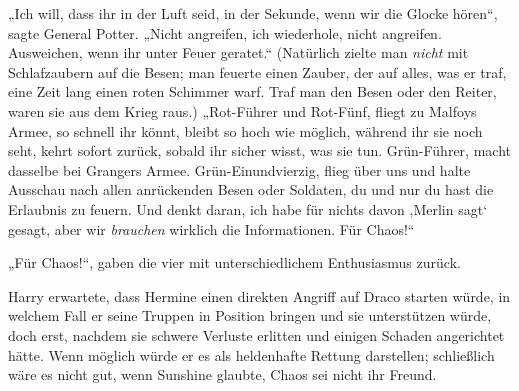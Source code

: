 „Ich will, dass ihr in der Luft seid, in der Sekunde, wenn wir die Glocke hören“, sagte General Potter. „Nicht angreifen, ich wiederhole, nicht angreifen. Ausweichen, wenn ihr unter Feuer geratet.“ (Natürlich zielte man \emph{nicht} mit Schlafzaubern auf die Besen; man feuerte einen Zauber, der auf alles, was er traf, eine Zeit lang einen roten Schimmer warf. Traf man den Besen oder den Reiter, waren sie aus dem Krieg raus.) „Rot-Führer und Rot-Fünf, fliegt zu Malfoys Armee, so schnell ihr könnt, bleibt so hoch wie möglich, während ihr sie noch seht, kehrt sofort zurück, sobald ihr sicher wisst, was sie tun. Grün-Führer, macht dasselbe bei Grangers Armee. Grün-Einundvierzig, flieg über uns und halte Ausschau nach allen anrückenden Besen oder Soldaten, du und nur du hast die Erlaubnis zu feuern. Und denkt daran, ich habe für nichts davon ‚Merlin sagt‘ gesagt, aber wir \emph{brauchen} wirklich die Informationen. Für Chaos!“

„Für Chaos!“, gaben die vier mit unterschiedlichem Enthusiasmus zurück.

Harry erwartete, dass Hermine einen direkten Angriff auf Draco starten würde, in welchem Fall er seine Truppen in Position bringen und sie unterstützen würde, doch erst, nachdem sie schwere Verluste erlitten und einigen Schaden angerichtet hätte. Wenn möglich würde er es als heldenhafte Rettung darstellen; schließlich wäre es nicht gut, wenn Sunshine glaubte, Chaos sei nicht ihr Freund.

